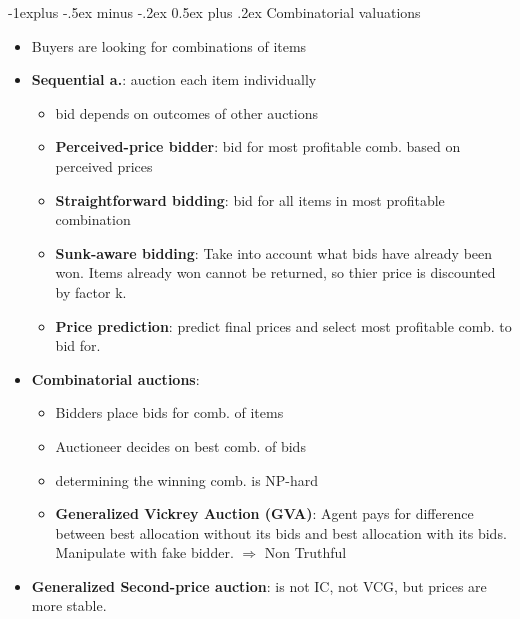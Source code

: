 \documentclass[10pt,a4paper,landscape]{article}
\makeatletter
\renewcommand{\subsection}{\@startsection{subsection}{2}{0mm}%
                                {-1explus -.5ex minus -.2ex}%
                                {0.5ex plus .2ex}%
                                {\normalfont\small\bfseries}}
\makeatother
\begin{document}
\begin{multicols*}{2}
\subsection{Combinatorial valuations}
\begin{itemize}
	\item Buyers are looking for combinations of items
	\item \textbf{Sequential a.}: auction each item individually
	\begin{itemize}
		\item bid depends on outcomes of other auctions
		\item \textbf{Perceived-price bidder}: bid for most profitable comb. based on perceived prices
		\item \textbf{Straightforward bidding}: bid for all items in most profitable combination
		\item \textbf{Sunk-aware bidding}: Take into account what bids have already been won. Items already won cannot be returned, so thier price is discounted by factor k.
		\item \textbf{Price prediction}: predict final prices and select most profitable comb. to bid for.
	\end{itemize}
	\item \textbf{Combinatorial auctions}:
	\begin{itemize}
		\item Bidders place bids for comb. of items
		\item Auctioneer decides on best comb. of bids
		\item determining the winning comb. is NP-hard
		\item \textbf{Generalized Vickrey Auction (GVA)}: Agent pays for difference between best allocation without its bids and best allocation with its bids. Manipulate with fake bidder. $\Rightarrow$ Non Truthful
	\end{itemize}
	\item \textbf{Generalized Second-price auction}: is not IC, not VCG, but prices are more stable.
\end{itemize}



\end{multicols*}
\end{document}

